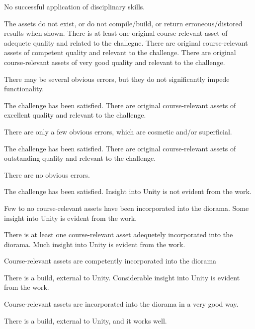 \documentclass{../../fal_assignment}
\begin{document}
\begin{markingrubric}
        \grade\fail 	No successful application of disciplinary skills.
            \par 		The assets do not exist, or do not compile/build, or return erroneous/distored results when shown.
        \grade 		There is at least one original course-relevant asset of adequete quality and related to the challegne.
        \grade 		There are original course-relevant assets of competent quality and relevant to the challenge.
        \grade 		There are original course-relevant assets of very good quality and relevant to the challenge.
            \par 		There may be several obvious errors, but they do not significantly impede functionality.
            \par		The challenge has been satisfied.
        \grade 		There are original course-relevant assets of excellent quality and relevant to the challenge.
            \par 		There are only a few obvious errors, which are cosmetic and/or superficial.
            \par		The challenge has been satisfied.    
        \grade 		There are original course-relevant assets of outstanding quality and relevant to the challenge.
            \par		There are no obvious errors.
            \par		The challenge has been satisfied.
%
        \grade\fail Insight into Unity is not evident from the work.
            \par Few to no course-relevant assets have been incorporated into the diorama.
        \grade Some insight into Unity is evident from the work.
            \par There is at least one course-relevant asset adequetely incorporated into the diorama.
        \grade Much insight into Unity is evident from the work.
            \par Course-relevant assets are competently incorporated into the diorama
            \par There is a build, external to Unity.
        \grade Considerable insight into Unity is evident from the work.
            \par Course-relevant assets are incorporated into the diorama in a very good way.
            \par There is a build, external to Unity, and it works well.

\end{markingrubric}
\end{document}
